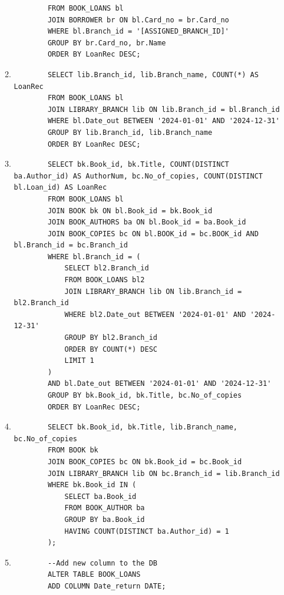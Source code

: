 \documentclass[12pt,a4paper]{article}
\begin{document}
\begin{enumerate}
\begin{enumerate}
\begin{verbatim}
        FROM BOOK_LOANS bl
        JOIN BORROWER br ON bl.Card_no = br.Card_no
        WHERE bl.Branch_id = '[ASSIGNED_BRANCH_ID]'
        GROUP BY br.Card_no, br.Name
        ORDER BY LoanRec DESC;
        \end{verbatim}
        \item
        \begin{verbatim}
        SELECT lib.Branch_id, lib.Branch_name, COUNT(*) AS LoanRec
        FROM BOOK_LOANS bl
        JOIN LIBRARY_BRANCH lib ON lib.Branch_id = bl.Branch_id
        WHERE bl.Date_out BETWEEN '2024-01-01' AND '2024-12-31'
        GROUP BY lib.Branch_id, lib.Branch_name
        ORDER BY LoanRec DESC;
        \end{verbatim}
        \item
        \begin{verbatim}
        SELECT bk.Book_id, bk.Title, COUNT(DISTINCT ba.Author_id) AS AuthorNum, bc.No_of_copies, COUNT(DISTINCT bl.Loan_id) AS LoanRec
        FROM BOOK_LOANS bl
        JOIN BOOK bk ON bl.Book_id = bk.Book_id
        JOIN BOOK_AUTHORS ba ON bl.Book_id = ba.Book_id
        JOIN BOOK_COPIES bc ON bl.BOOK_id = bc.BOOK_id AND bl.Branch_id = bc.Branch_id
        WHERE bl.Branch_id = (
            SELECT bl2.Branch_id
            FROM BOOK_LOANS bl2
            JOIN LIBRARY_BRANCH lib ON lib.Branch_id = bl2.Branch_id
            WHERE bl2.Date_out BETWEEN '2024-01-01' AND '2024-12-31'
            GROUP BY bl2.Branch_id
            ORDER BY COUNT(*) DESC
            LIMIT 1
        )
        AND bl.Date_out BETWEEN '2024-01-01' AND '2024-12-31'
        GROUP BY bk.Book_id, bk.Title, bc.No_of_copies
        ORDER BY LoanRec DESC;
        \end{verbatim}

        \item
        \begin{verbatim}
        SELECT bk.Book_id, bk.Title, lib.Branch_name, bc.No_of_copies
        FROM BOOK bk
        JOIN BOOK_COPIES bc ON bk.Book_id = bc.Book_id
        JOIN LIBRARY_BRANCH lib ON bc.Branch_id = lib.Branch_id
        WHERE bk.Book_id IN (
            SELECT ba.Book_id
            FROM BOOK_AUTHOR ba
            GROUP BY ba.Book_id
            HAVING COUNT(DISTINCT ba.Author_id) = 1
        );
        \end{verbatim}
        \item
        \begin{verbatim}
        --Add new column to the DB
        ALTER TABLE BOOK_LOANS
        ADD COLUMN Date_return DATE;


\end{verbatim}
\end{enumerate}
\end{enumerate}
\end{document}
